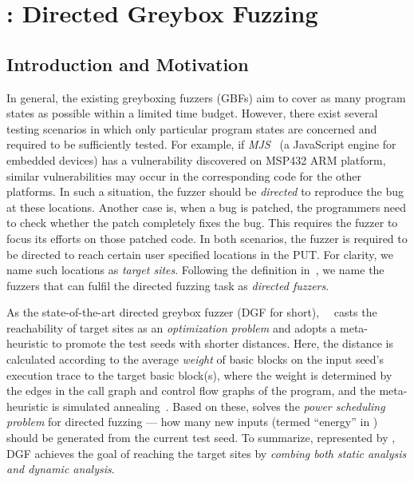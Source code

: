 
\chapter{\dFOT: Directed Greybox Fuzzing} \label{ch:dfot}


\section{Introduction and Motivation}


In general, the existing greyboxing fuzzers (GBFs) aim to cover as many program states as possible within a limited time budget.
However, there exist several testing scenarios in which only particular program states are concerned and required to be sufficiently tested. 
For example, if \emph{MJS}~\cite{mjs} (a JavaScript engine for embedded devices) has a vulnerability discovered on MSP432 ARM platform, similar vulnerabilities may occur in the corresponding code for the other platforms.
In such a situation, the fuzzer should be \emph{directed} to reproduce the bug at these locations.
Another case is, when a bug is patched, the programmers need to check whether the patch completely fixes the bug. 
This requires the fuzzer to focus its efforts on those patched code.
In both scenarios, the fuzzer is required to be directed to reach certain user specified locations in the PUT.
For clarity, we name such locations as \emph{target sites}.
Following the definition in~\cite{Bohme:2017:DGF}, we name the fuzzers that can fulfil the directed fuzzing task as \emph{directed fuzzers}.




As the state-of-the-art directed greybox fuzzer (DGF for short), {\aflgo}~\cite{Bohme:2017:DGF}~casts the reachability of target sites as an \emph{optimization problem} and adopts a meta-heuristic to promote the test seeds with shorter distances.
Here, the distance is calculated according to the average \emph{weight} of basic blocks on the input seed's execution trace to the target basic block(s), where the weight
 is determined by the edges in the call graph and control flow graphs of the program, and the meta-heuristic is simulated annealing~\cite{kirkpatrick1983optimization}.
Based on these, \aflgo solves the \emph{power scheduling problem} for directed fuzzing --- how many new inputs (termed ``energy'' in \aflgo) should be generated from the current test seed.
To summarize, represented by \aflgo, DGF achieves the goal of reaching the target sites by \emph{combing both static analysis and dynamic analysis}.


